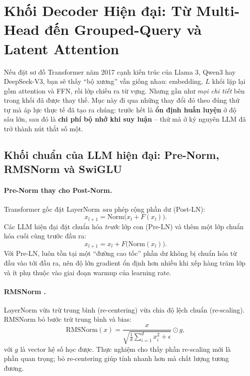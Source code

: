 
\section{Khối Decoder Hiện đại: Từ Multi-Head đến Grouped-Query và Latent Attention \newtag}
\label{sec:modern_decoder_attention}

Nếu đặt sơ đồ Transformer năm 2017 cạnh kiến trúc của Llama 3, Qwen3 hay DeepSeek-V3, bạn sẽ thấy “bộ xương” vẫn giống nhau: embedding, $L$ khối lặp lại gồm attention và FFN, rồi lớp chiếu ra từ vựng. Nhưng gần như \emph{mọi chi tiết} bên trong khối đã được thay thế. Mục này đi qua những thay đổi đó theo đúng thứ tự mà áp lực thực tế đã tạo ra chúng: trước hết là \textbf{ổn định huấn luyện} ở độ sâu lớn, sau đó là \textbf{chi phí bộ nhớ khi suy luận} -- thứ mà ở kỷ nguyên LLM đã trở thành nút thắt số một.

\subsection{Khối chuẩn của LLM hiện đại: Pre-Norm, RMSNorm và SwiGLU}
\label{ssec:modern_block}

\paragraph{Pre-Norm thay cho Post-Norm.}
Transformer gốc đặt LayerNorm \emph{sau} phép cộng phần dư (Post-LN):
\[
x_{l+1} = \text{Norm}\big(x_l + F(x_l)\big).
\]
Các LLM hiện đại đặt chuẩn hóa \emph{trước} lớp con (Pre-LN) và thêm một lớp chuẩn hóa cuối cùng trước đầu ra:
\[
x_{l+1} = x_l + F\big(\text{Norm}(x_l)\big).
\]
Với Pre-LN, luôn tồn tại một “đường cao tốc” phần dư không bị chuẩn hóa từ đầu vào tới đầu ra, nên độ lớn gradient ổn định hơn nhiều khi xếp hàng trăm lớp và ít phụ thuộc vào giai đoạn warmup của learning rate.

\paragraph{RMSNorm \cite{zhang2019rmsnorm}.} LayerNorm vừa trừ trung bình (re-centering) vừa chia độ lệch chuẩn (re-scaling). RMSNorm bỏ bước trừ trung bình và bias:
\[
\text{RMSNorm}(x) = \frac{x}{\sqrt{\frac{1}{d}\sum_{i=1}^{d} x_i^2 + \epsilon}} \odot g,
\]
với $g$ là vector hệ số học được. Thực nghiệm cho thấy phần re-scaling mới là phần quan trọng; bỏ re-centering giúp tính nhanh hơn mà chất lượng tương đương.

